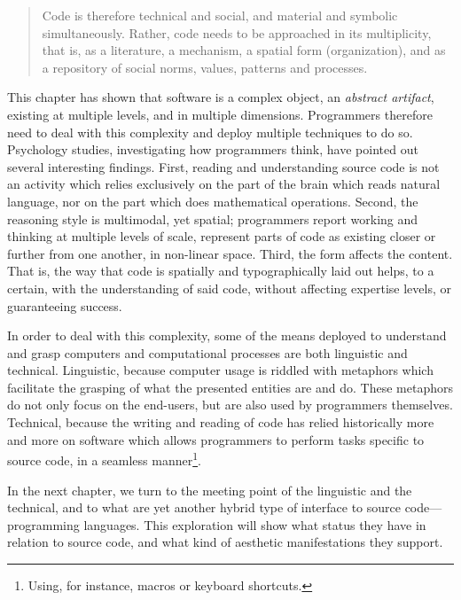\spacer

\begin{quote}
    Code is therefore technical and social, and material and symbolic simultaneously. Rather, code needs to be approached in its multiplicity, that is, as a literature, a mechanism, a spatial form (organization), and as a repository of social norms, values, patterns and processes. \citep{berry_philosophy_2011}
\end{quote}

This chapter has shown that software is a complex object, an \emph{abstract artifact}, existing at multiple levels, and in multiple dimensions. Programmers therefore need to deal with this complexity and deploy multiple techniques to do so. Psychology studies, investigating how programmers think, have pointed out several interesting findings. First, reading and understanding source code is not an activity which relies exclusively on the part of the brain which reads natural language, nor on the part which does mathematical operations. Second, the reasoning style is multimodal, yet spatial; programmers report working and thinking at multiple levels of scale, represent parts of code as existing closer or further from one another, in non-linear space. Third, the form affects the content. That is, the way that code is spatially and typographically laid out helps, to a certain, with the understanding of said code, without affecting expertise levels, or guaranteeing success.

In order to deal with this complexity, some of the means deployed to understand and grasp computers and computational processes are both linguistic and technical. Linguistic, because computer usage is riddled with metaphors which facilitate the grasping of what the presented entities are and do. These metaphors do not only focus on the end-users, but are also used by programmers themselves. Technical, because the writing and reading of code has relied historically more and more on software which allows programmers to perform tasks specific to source code, in a seamless manner\footnote{Using, for instance, macros or keyboard shortcuts.}.

In the next chapter, we turn to the meeting point of the linguistic and the technical, and to what are yet another hybrid type of interface to source code—programming languages. This exploration will show what status they have in relation to source code, and what kind of aesthetic manifestations they support.